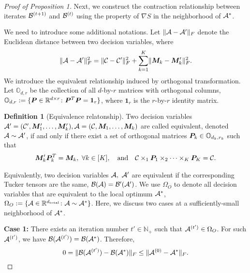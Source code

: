 \documentclass[11pt]{article}
\theoremstyle{plain}
\theoremstyle{definition}
\newtheorem{defn}{Definition}
\begin{document}
\begin{proof}[Proof of Proposition 1]
Next, we construct the contraction relationship between iterates $\mathcal{B}^{(t+1)}$ and $\mathcal{B}^{(t)}$ using the property of $\nabla S$ in the neighborhood of $\mathcal{A}^*$. 

We need to introduce some additional notations. Let $\lVert\mathcal{A}-\mathcal{A}'\rVert_F$ denote the Euclidean distance between two decision variables, where 
\begin{align}\label{eq:Fnorm}
 \lVert\mathcal{A}-\mathcal{A}'\rVert_F^2 = \lVert\mathcal{C} - \mathcal{C}'\rVert_F^2 + \sum_{k=1}^K \lVert\bm M_k - \bm M'_k\rVert_F^2.
\end{align} 
We introduce the equivalent relationship induced by orthogonal transformation. Let $\mathbb{O}_{d,r}$ be the collection of all $d$-by-$r$ matrices with orthogonal columns, $\mathbb{O}_{d,r}:=\{\bm{P}\in\mathbb{R}^{d\times r}\colon \bm{P}^T\bm{P} = \mathbf{1}_r\}$, where $\mathbf{1}_r$ is the $r$-by-$r$ identity matrix. 

\begin{defn}[Equivalence relatonship]
Two decision variables $\mathcal{A}'=(\mathcal{C}', \bm M'_1,\ldots,\bm M'_k), \mathcal{A}=(\mathcal{C}, \bm M_1,\ldots,\bm M_k)$ are called equivalent, denoted $\mathcal{A}\sim \mathcal{A}'$, if and only if there exist a set of orthogonal matrices $\bm{P}_k \in \mathbb{O}_{d_k,r_k}$ such that
\begin{align}
	\bm M'_k \bm{P}^T_k = \bm M_k ,\ \forall k \in [K], \quad \text{and}\quad \mathcal{C} \times_1 \bm{P}_1 \times_2  \dots \times_K \bm{P}_K = \mathcal{C}.
\end{align}
\end{defn}

Equivalently, two decision variables $\tA,\ \tA'$ are equivalent if the corresponding Tucker tensors are the same, $\mathcal{B}(\mathcal{A})=\mathcal{B}'(\mathcal{A}')$. We use $\Omega_O$ to denote all decision variables that are equivalent to the local optimum $\mathcal{A}^*$, $\Omega_O:=\{\mathcal{A}\in\mathbb{R}^{d_{\text{total}}}\colon \mathcal{A}\sim \mathcal{A}^*\}$. Here, we discuss two cases at a sufficiently-small neighborhood of $\mathcal{A}^*$.

\textbf{Case 1:} There exists an iteration number $t'\in\mathbb{N}_{+}$ such that $\mathcal{A}^{(t')} \in \Omega_O$. For such $\mathcal{A}^{(t')}$, we have $\mathcal{B}(\mathcal{A}^{(t')}) = \mathcal{B}(\mathcal{A}^*)$. Therefore, 
\begin{align}\label{pro:case1}
	0= \lVert\mathcal{B}(\mathcal{A}^{(t')}) - \mathcal{B}(\mathcal{A}^*)\rVert_F \leq \lVert\mathcal{A}^{(0)} - \mathcal{A}^*\rVert_F.
\end{align}


\end{proof}
\end{document}
